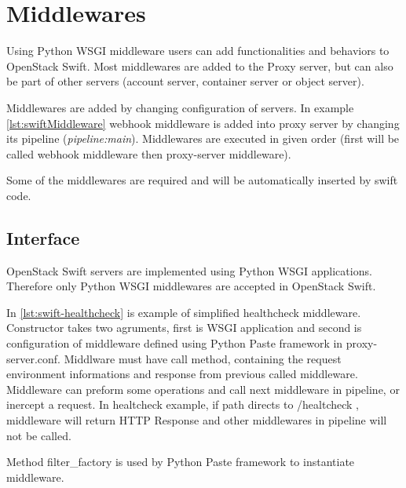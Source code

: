     \section{Middlewares}
    Using Python WSGI middleware users can add functionalities and behaviors to OpenStack Swift. Most middlewares are added to the Proxy server, but can also be part of other servers (account server, container server or object server).

    Middlewares are added by changing configuration of servers. In example \ref{lst:swiftMiddleware}
    webhook middleware is added into proxy server by changing its pipeline (\textit{pipeline:main}). Middlewares are executed in given order (first will be called webhook middleware then proxy-server middleware).

    Some of the middlewares are required and will be automatically inserted by swift code\cite{swiftMiddleware}.

    \subsection{Interface}
    OpenStack Swift servers are implemented using Python WSGI applications. Therefore only Python WSGI middlewares are accepted in OpenStack Swift.

    In \ref{lst:swift-healthcheck} is example of simplified healthcheck middleware. Constructor takes two agruments, first is WSGI application and second is configuration of middleware defined using Python Paste framework in proxy-server.conf. Middlware must have call method, containing the request environment informations and response from previous called middleware. Middleware can preform some operations and call next middleware in pipeline, or inercept a request. In healtcheck example, if path directs to /healtcheck , middleware will return HTTP Response and other middlewares in pipeline will not be called.

    Method filter\_factory is used by Python Paste framework to instantiate middleware.



